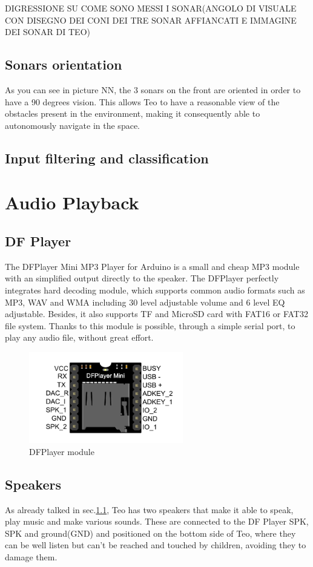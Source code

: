 DIGRESSIONE SU COME SONO MESSI I SONAR(ANGOLO DI VISUALE CON DISEGNO DEI CONI DEI TRE SONAR AFFIANCATI E IMMAGINE DEI SONAR DI TEO)
\subsection{Sonars orientation}
As you can see in picture NN, the 3 sonars on the front are oriented in order to have a 90 degrees vision. This allows Teo to have a reasonable view of the obstacles present in the environment, making it consequently able to autonomously navigate in the space.
\subsection{Input filtering and classification}
\section{Audio Playback}
\subsection{DF Player}
\label{DFPlayer}
The DFPlayer Mini MP3 Player for Arduino is a small and cheap MP3 module with an simplified output directly to the speaker. The DFPlayer perfectly integrates hard decoding module, which supports common audio formats such as MP3, WAV and WMA including 30 level adjustable volume and 6 level EQ adjustable. Besides, it also supports TF and MicroSD card with FAT16 or FAT32 file system. Thanks to this module is possible, through a simple serial port, to play any audio file, without great effort.

\begin{figure}[h]
	\centering
	\includegraphics[width=0.6\textwidth]{dfplayer}
	\caption{DFPlayer module}
	\label{fig:DFPlayer}
\end{figure}
\subsection{Speakers}
As already talked in sec.\ref{DFPlayer}, Teo has two speakers that make it able to speak, play music and make various sounds. These are connected to the DF Player SPK, SPK and ground(GND) and positioned on the bottom side of Teo, where they can be well listen but can't be reached and touched by children, avoiding they to damage them.
